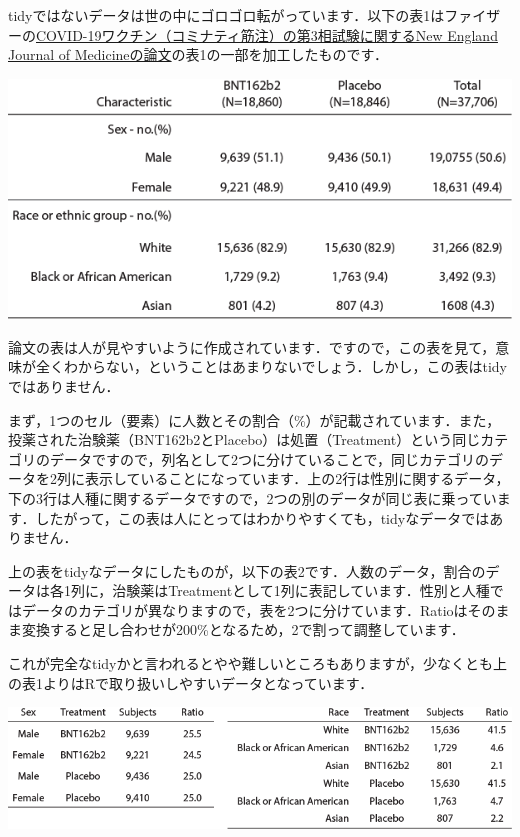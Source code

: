 \documentclass[
  letterpaper,
  DIV=11,
  numbers=noendperiod]{scrreprt}
\begin{document}
tidyではないデータは世の中にゴロゴロ転がっています．以下の表1はファイザーの\href{https://www.nejm.org/doi/pdf/10.1056/NEJMoa2034577?articleTools=true}{COVID-19ワクチン（コミナティ筋注）の第3相試験に関するNew
England Journal of Medicineの論文}の表1の一部を加工したものです．

\includegraphics{././image/chapter16_nontidy.png}

論文の表は人が見やすいように作成されています．ですので，この表を見て，意味が全くわからない，ということはあまりないでしょう．しかし，この表はtidyではありません．

まず，1つのセル（要素）に人数とその割合（\%）が記載されています．また，投薬された治験薬（BNT162b2とPlacebo）は処置（Treatment）という同じカテゴリのデータですので，列名として2つに分けていることで，同じカテゴリのデータを2列に表示していることになっています．上の2行は性別に関するデータ，下の3行は人種に関するデータですので，2つの別のデータが同じ表に乗っています．したがって，この表は人にとってはわかりやすくても，tidyなデータではありません．

上の表をtidyなデータにしたものが，以下の表2です．人数のデータ，割合のデータは各1列に，治験薬はTreatmentとして1列に表記しています．性別と人種ではデータのカテゴリが異なりますので，表を2つに分けています．Ratioはそのまま変換すると足し合わせが200\%となるため，2で割って調整しています．

これが完全なtidyかと言われるとやや難しいところもありますが，少なくとも上の表1よりはRで取り扱いしやすいデータとなっています．

\includegraphics{././image/chapter16_tidy.png}
\end{document}
